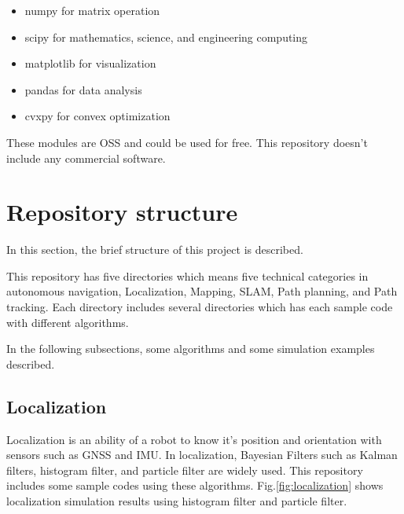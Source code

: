 \documentclass{bmvc2k}
\begin{document}
\begin{itemize}
 \item numpy\cite{numpy} for matrix operation
 \item scipy\cite{scipy} for mathematics, science, and engineering computing
 \item matplotlib\cite{matplotlib} for visualization
 \item pandas\cite{pandas} for data analysis
 \item cvxpy\cite{cvxpy} for convex optimization
\end{itemize}

These modules are OSS and could be used for free. This repository doesn't include any commercial software.


\section{Repository structure}

In this section, the brief structure of this project is described.

This repository has five directories which means five technical categories in autonomous navigation, Localization, Mapping, SLAM, Path planning, and Path tracking. Each directory includes several directories which has each sample code with different algorithms.

In the following subsections, some algorithms and some simulation examples described.

\subsection{Localization}

Localization is an ability of a robot to know it's position and orientation with sensors such as GNSS and IMU.
In localization, Bayesian Filters such as Kalman filters, histogram filter, and particle filter are widely used\cite{PR}.
This repository includes some sample codes using these algorithms.
Fig.\ref{fig:localization} shows localization simulation results using histogram filter and particle filter.
\end{document}
